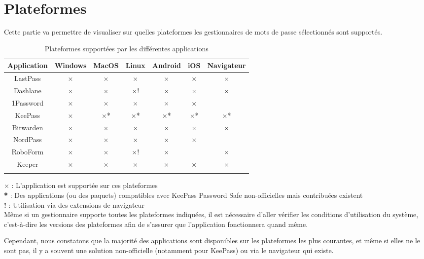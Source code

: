 \section{Plateformes}
Cette partie va permettre de visualiser sur quelles plateformes les gestionnaires de mots de passe sélectionnés sont supportés. \\
\begin{longtable}[h]{|c|c|c|c|c|c|c|}
	\hline
	Application & Windows & MacOS & Linux & Android & iOS & Navigateur  \\
	\hline
	LastPass & $\times$ & $\times$ & $\times$ & $\times$ & $\times$ &  $\times$\\
	\hline
	Dashlane & $\times$ & $\times$ & $\times$! & $\times$ & $\times$ & $\times$  \\
	\hline
	1Password & $\times$ & $\times$ & $\times$ & $\times$ & $\times$& \\
	\hline
	KeePass & $\times$ & $\times$* & $\times$*  & $\times$* & $\times$* &  $\times$*  \\
	\hline
	Bitwarden & $\times$ & $\times$  & $\times$ & $\times$ & $\times$ & $\times$  \\
	\hline
	NordPass & $\times$ & $\times$ & $\times$  & $\times$ & $\times$ &  \\
	\hline
	RoboForm & $\times$ & $\times$ & $\times$! & $\times$ & & $\times$ \\
	\hline
	Keeper & $\times$ & $\times$ & $\times$ & $\times$ &$\times$ & $\times$ \\
	\hline
  \caption{Plateformes supportées par les différentes applications}
\end{longtable}
$\times$ : L'application est supportée sur ces plateformes \\
\textbf{*}\hspace{0.1cm} :  Des applications (ou des paquets) compatibles avec KeePass Password Safe non-officielles mais contribuées existent \\
\textbf{!}\hspace{0.18cm} : Utilisation via des extensions de navigateur \\

Même si un gestionnaire supporte toutes les plateformes indiquées, il est nécessaire d'aller vérifier les conditions d'utilisation du système, c'est-à-dire les versions des plateformes afin de s'assurer que l'application fonctionnera quand même. 

Cependant, nous constatons que la majorité des applications sont disponibles sur les plateformes les plus courantes, et même si elles ne le sont pas, il y a souvent une solution non-officielle (notamment pour KeePass) ou via le navigateur qui existe.

